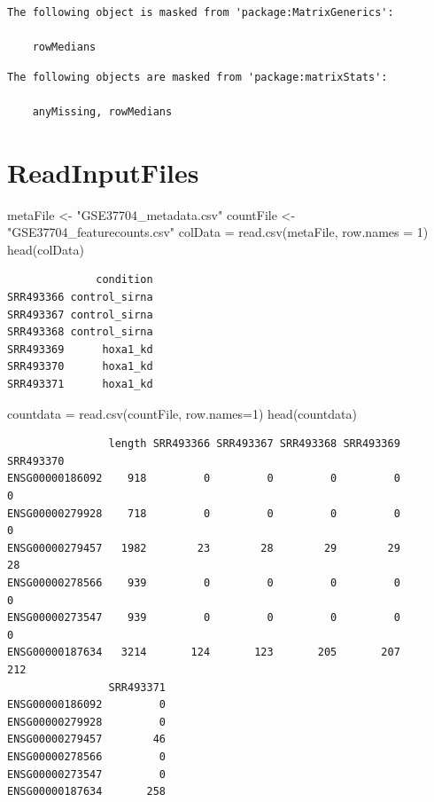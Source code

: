 \documentclass[
  letterpaper,
  DIV=11,
  numbers=noendperiod]{scrartcl}
\newenvironment{Shaded}{\begin{snugshade}}{\end{snugshade}}
\newcommand{\AttributeTok}[1]{\textcolor[rgb]{0.40,0.45,0.13}{#1}}
\newcommand{\DecValTok}[1]{\textcolor[rgb]{0.68,0.00,0.00}{#1}}
\newcommand{\FunctionTok}[1]{\textcolor[rgb]{0.28,0.35,0.67}{#1}}
\newcommand{\NormalTok}[1]{\textcolor[rgb]{0.00,0.23,0.31}{#1}}
\newcommand{\OtherTok}[1]{\textcolor[rgb]{0.00,0.23,0.31}{#1}}
\newcommand{\StringTok}[1]{\textcolor[rgb]{0.13,0.47,0.30}{#1}}
\begin{document}
\begin{verbatim}
The following object is masked from 'package:MatrixGenerics':

    rowMedians
\end{verbatim}

\begin{verbatim}
The following objects are masked from 'package:matrixStats':

    anyMissing, rowMedians
\end{verbatim}

\hypertarget{readinputfiles}{%
\section{ReadInputFiles}\label{readinputfiles}}

\begin{Shaded}
\begin{Highlighting}[]
\NormalTok{metaFile }\OtherTok{\textless{}{-}} \StringTok{"GSE37704\_metadata.csv"}
\NormalTok{countFile }\OtherTok{\textless{}{-}} \StringTok{"GSE37704\_featurecounts.csv"}
\NormalTok{colData }\OtherTok{=} \FunctionTok{read.csv}\NormalTok{(metaFile, }\AttributeTok{row.names =} \DecValTok{1}\NormalTok{)}
\FunctionTok{head}\NormalTok{(colData)}
\end{Highlighting}
\end{Shaded}

\begin{verbatim}
              condition
SRR493366 control_sirna
SRR493367 control_sirna
SRR493368 control_sirna
SRR493369      hoxa1_kd
SRR493370      hoxa1_kd
SRR493371      hoxa1_kd
\end{verbatim}

\begin{Shaded}
\begin{Highlighting}[]
\NormalTok{countdata }\OtherTok{=} \FunctionTok{read.csv}\NormalTok{(countFile, }\AttributeTok{row.names=}\DecValTok{1}\NormalTok{)}
\FunctionTok{head}\NormalTok{(countdata)}
\end{Highlighting}
\end{Shaded}

\begin{verbatim}
                length SRR493366 SRR493367 SRR493368 SRR493369 SRR493370
ENSG00000186092    918         0         0         0         0         0
ENSG00000279928    718         0         0         0         0         0
ENSG00000279457   1982        23        28        29        29        28
ENSG00000278566    939         0         0         0         0         0
ENSG00000273547    939         0         0         0         0         0
ENSG00000187634   3214       124       123       205       207       212
                SRR493371
ENSG00000186092         0
ENSG00000279928         0
ENSG00000279457        46
ENSG00000278566         0
ENSG00000273547         0
ENSG00000187634       258
\end{verbatim}
\end{document}
